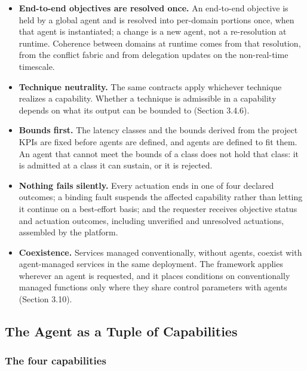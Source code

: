 \begin{itemize}
  \textbf{No global runtime brain.} DEs are per domain and fast loops
  close locally. Intelligence at the IDMO sets objectives and bounds for
  domains through delegations on the non-real-time timescale; it does
  not issue control commands to infrastructure.
\item
  \textbf{End-to-end objectives are resolved once.} An end-to-end
  objective is held by a global agent and is resolved into per-domain
  portions once, when that agent is instantiated; a change is a new
  agent, not a re-resolution at runtime. Coherence between domains at
  runtime comes from that resolution, from the conflict fabric and from
  delegation updates on the non-real-time timescale.
\item
  \textbf{Technique neutrality.} The same contracts apply whichever
  technique realizes a capability. Whether a technique is admissible in
  a capability depends on what its output can be bounded to (Section
  3.4.6).
\item
  \textbf{Bounds first.} The latency classes and the bounds derived from
  the project KPIs are fixed before agents are defined, and agents are
  defined to fit them. An agent that cannot meet the bounds of a class
  does not hold that class: it is admitted at a class it can sustain, or
  it is rejected.
\item
  \textbf{Nothing fails silently.} Every actuation ends in one of four
  declared outcomes; a binding fault suspends the affected capability
  rather than letting it continue on a best-effort basis; and the
  requester receives objective status and actuation outcomes, including
  unverified and unresolved actuations, assembled by the platform.
\item
  \textbf{Coexistence.} Services managed conventionally, without agents,
  coexist with agent-managed services in the same deployment. The
  framework applies wherever an agent is requested, and it places
  conditions on conventionally managed functions only where they share
  control parameters with agents (Section 3.10).
\end{itemize}

\hypertarget{the-agent-as-a-tuple-of-capabilities}{%
\subsection{The Agent as a Tuple of Capabilities}\label{the-agent-as-a-tuple-of-capabilities}}

\hypertarget{the-four-capabilities}{%
\subsubsection{The four capabilities}\label{the-four-capabilities}}

